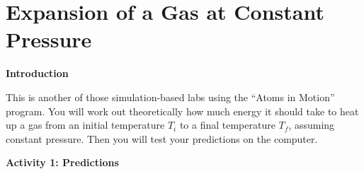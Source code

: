 \section{Expansion of a Gas at Constant Pressure}
\begin{comment}
This lab was written by Ted Bunn for spring of 2016.  It was edited slightly by Matt Trawick for this manual in April 2016.

\end{comment}

\makelabheader %

\bigskip

\textbf{Introduction}

This is another of those simulation-based labs using the ``Atoms in
Motion'' program.  You will work out theoretically how much energy it
should take to heat up a gas from an initial temperature $T_i$
to a final temperature $T_f$, assuming constant pressure.  Then you will
test your predictions on the computer.

\bigskip

\textbf{Activity 1: Predictions}

